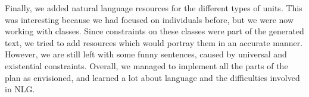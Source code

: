 \documentclass[12pt, letterpaper]{article}
\begin{document}
    \vspace{4mm}

    \noindent
    Finally, we added natural language resources for the different types of units.
    This was interesting because we had focused on individuals before, but we were now working with classes.
    Since constraints on these classes were part of the generated text, we tried to add resources which
    would portray them in an accurate manner.
    However, we are still left with some funny sentences, caused by universal and existential constraints.
    Overall, we managed to implement all the parts of the plan as envisioned, and
    learned a lot about language and the difficulties involved in NLG.
\end{document}
